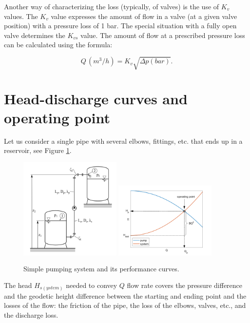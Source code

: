 Another way of characterizing the loss (typically, of valves) is the use of $K_v$ values. The $K_v$ value expresses the amount of flow in a valve (at a given valve position) with a pressure loss of 1 bar. The special situation with a fully open valve determines the $K_{vs}$ value. The amount of flow at a prescribed pressure loss can be calculated using the formula:

\begin{equation}
Q\,\left( m^3/h\right) = K_v \sqrt{\Delta p \left( bar \right)}.
\end{equation}

\section{Head-discharge curves and operating point} \label{sec:head_discharge_curves_and_operating_point}

Let us consider a single pipe with several elbows, fittings, etc. that ends up in a reservoir, see Figure \ref{fig:SimplePumpingSystem}. 

\begin{figure}[ht]
\centering
\includegraphics[width=0.45\textwidth]{figs/Hydraulic_system_sample.png}
\includegraphics[width=0.45\textwidth]{figs/performance_curve_simple.png} 
\caption{\label{fig:SimplePumpingSystem}Simple pumping system and its performance curves.}
\end{figure} 

The head $H_{s(ystem)}$ needed to convey $Q$ flow rate covers the pressure difference and the geodetic height difference between the starting and ending point and the losses of the flow: the friction of the pipe, the loss of the elbows, valves, etc., and the discharge loss.

